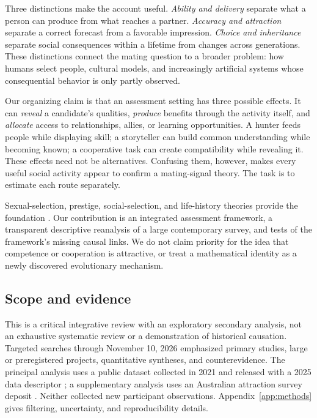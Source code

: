 \documentclass[10pt,twocolumn,letterpaper]{article}
\begin{document}
Three distinctions make the account useful. \emph{Ability and delivery} separate what a person can produce from what reaches a partner. \emph{Accuracy and attraction} separate a correct forecast from a favorable impression. \emph{Choice and inheritance} separate social consequences within a lifetime from changes across generations. These distinctions connect the mating question to a broader problem: how humans select people, cultural models, and increasingly artificial systems whose consequential behavior is only partly observed.

Our organizing claim is that an assessment setting has three possible effects. It can \emph{reveal} a candidate's qualities, \emph{produce} benefits through the activity itself, and \emph{allocate} access to relationships, allies, or learning opportunities. A hunter feeds people while displaying skill; a storyteller can build common understanding while becoming known; a cooperative task can create compatibility while revealing it. These effects need not be alternatives. Confusing them, however, makes every useful social activity appear to confirm a mating-signal theory. The task is to estimate each route separately.

Sexual-selection, prestige, social-selection, and life-history theories provide the foundation \citep{miller,henrich,west,deblock}. Our contribution is an integrated assessment framework, a transparent descriptive reanalysis of a large contemporary survey, and tests of the framework's missing causal links. We do not claim priority for the idea that competence or cooperation is attractive, or treat a mathematical identity as a newly discovered evolutionary mechanism.

\subsection{Scope and evidence}
This is a critical integrative review with an exploratory secondary analysis, not an exhaustive systematic review or a demonstration of historical causation. Targeted searches through November 10, 2026 emphasized primary studies, large or preregistered projects, quantitative syntheses, and counterevidence. The principal analysis uses a public dataset collected in 2021 and released with a 2025 data descriptor \citep{kowal2025}; a supplementary analysis uses an Australian attraction survey deposit \citep{whyte2021}. Neither collected new participant observations. Appendix~\ref{app:methods} gives filtering, uncertainty, and reproducibility details.
\end{document}
